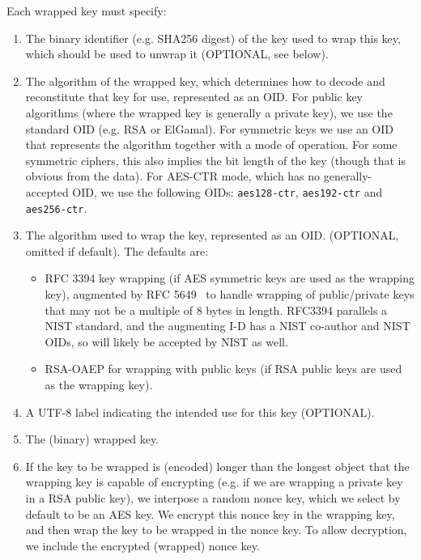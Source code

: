 Each wrapped key must specify:
\begin{enumerate}
\item The binary identifier (e.g. SHA256 digest) of the key used to
  wrap this key, which should be used to unwrap it (OPTIONAL, see
  below).

\item The algorithm of the wrapped key, which determines how to decode
  and reconstitute that key for use, represented as an OID. For public
  key algorithms (where the wrapped key is generally a private key),
  we use the standard OID (e.g. RSA or ElGamal). For symmetric keys we
  use an OID that represents the algorithm together with a mode of
  operation. For some symmetric ciphers, this also implies the bit
  length of the key (though that is obvious from the data). For
  AES-CTR mode, which has no generally-accepted OID, we use the
  following OIDs: {\tt aes128-ctr}, {\tt aes192-ctr} and {\tt
    aes256-ctr}.

\item The algorithm used to wrap the key, represented as an OID. (OPTIONAL, omitted if default). The defaults are:
  \begin{itemize}
  \item RFC 3394 key wrapping (if AES symmetric keys are used as the
    wrapping key), augmented by RFC 5649~\cite{HD2009} to handle
    wrapping of public/private keys that may not be a multiple of 8
    bytes in length. RFC3394 parallels a NIST standard, and the
    augmenting I-D has a NIST co-author and NIST OIDs, so will likely
    be accepted by NIST as well.
  \item RSA-OAEP for wrapping with public keys (if RSA public keys are used as the wrapping key).
  \end{itemize}

\item A UTF-8 label indicating the intended use for this key (OPTIONAL).
\item The (binary) wrapped key.
\item If the key to be wrapped is (encoded) longer than the longest
  object that the wrapping key is capable of encrypting (e.g. if we
  are wrapping a private key in a RSA public key), we interpose a
  random nonce key, which we select by default to be an AES key. We
  encrypt this nonce key in the wrapping key, and then wrap the key to
  be wrapped in the nonce key. To allow decryption, we include the
  encrypted (wrapped) nonce key.
\end{enumerate}

